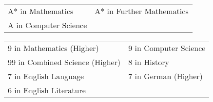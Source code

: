 \documentclass[a4paper, 12pt]{article}
\newlength{\spacebox}
\newcommand{\skill}[2]{
	\noindent\hangindent=2em\hangafter=0
	\parbox{3\spacebox}{
		\textbf{#1}}
	#2 \par}
\begin{document}
\begin{center}
	\begin{tabular}{m{12em} m{12em}}
		A* in Mathematics & A* in Further Mathematics \\
		A in Computer Science
	\end{tabular}
\end{center}

\begin{center}
\end{center}

\begin{center}
	\begin{tabular}{m{16em} m{10em}}
		9 in Mathematics (Higher) & 9 in Computer Science \\
		99 in Combined Science (Higher) & 8 in History \\
		7 in English Language & 7 in German (Higher) \\
		6 in English Literature
	\end{tabular}
\end{center}

\end{document}
